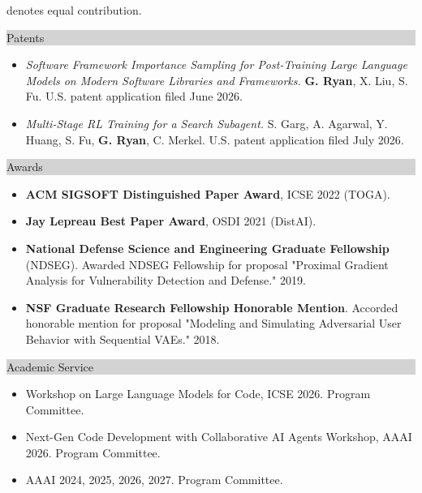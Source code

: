 \documentclass{article} %
\newcommand{\rsection}[1]{
  \hspace{-0.4cm}\vspace{0.1cm}
\colorbox{lightgrey}{
\begin{minipage}{1.07\linewidth}
\vspace{0.22cm}
\fontsize{14pt}{16pt}\selectfont #1
\vspace{0.12cm}
\end{minipage}
}
\par\nopagebreak %
}
\begin{document}
\vspace{-0.1cm}
{\footnotesize * denotes equal contribution.}

\vspace{0.05cm}
\rsection{Patents}
\hspace*{-0.1cm}

\begin{minipage}{1.01\linewidth}
\begin{itemize}[label={},itemindent=-2em,leftmargin=2em,parsep=1pt,itemsep=0pt,topsep=3pt]
  \item \textit{Software Framework Importance Sampling for Post-Training Large Language Models on Modern Software Libraries and Frameworks.}
    \textbf{G. Ryan}, X. Liu, S. Fu. U.S. patent application filed June 2026.
  \item \textit{Multi-Stage RL Training for a Search Subagent.}
    S. Garg, A. Agarwal, Y. Huang, S. Fu, \textbf{G. Ryan}, C. Merkel. U.S. patent application filed July 2026.
\end{itemize}
\end{minipage}

\vspace{0.05cm}
\rsection{Awards}
\hspace*{-0.1cm}

\begin{minipage}{1.01\linewidth}
\begin{itemize}[label={},itemindent=-2em,leftmargin=2em,parsep=1pt,itemsep=0pt,topsep=3pt]
  \item {\bf ACM SIGSOFT Distinguished Paper Award}, ICSE 2022 (TOGA).
  \item {\bf Jay Lepreau Best Paper Award}, OSDI 2021 (DistAI).
  \item {\bf National Defense Science and Engineering Graduate Fellowship} (NDSEG). Awarded NDSEG Fellowship for proposal "Proximal Gradient Analysis for Vulnerability Detection and Defense." 2019.
  \item {\bf NSF Graduate Research Fellowship Honorable Mention}. Accorded honorable mention for proposal "Modeling and Simulating Adversarial User Behavior with Sequential VAEs." 2018.
  \end{itemize}
\end{minipage}

\vspace{0.05cm}

\rsection{Academic Service}
\hspace*{-0.1cm}
\begin{minipage}{1.01\linewidth}
\begin{itemize}[label={},itemindent=-2em,leftmargin=2em,parsep=1pt,itemsep=0pt,topsep=3pt]
  \item Workshop on Large Language Models for Code, ICSE 2026. Program Committee.
  \item Next-Gen Code Development with Collaborative AI Agents Workshop, AAAI 2026. Program Committee.
  \item AAAI 2024, 2025, 2026, 2027. Program Committee.
  \end{itemize}
\end{minipage}
\end{document}

